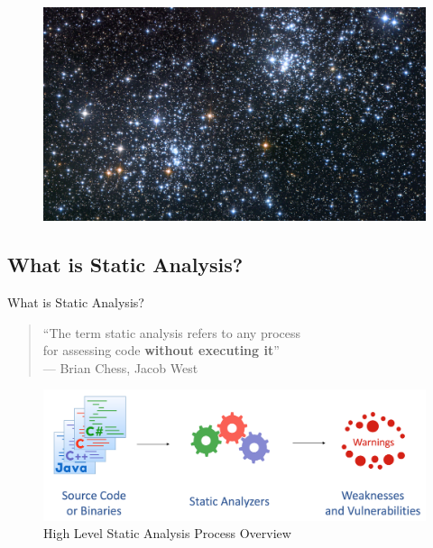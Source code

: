 \documentclass[aspectratio=169]{beamer}
\newenvironment{changemargin}[2]{%
\begin{list}{}{%
\setlength{\topsep}{0pt}%
\setlength{\leftmargin}{#1}%
\setlength{\rightmargin}{#2}%
\setlength{\listparindent}{\parindent}%
\setlength{\itemindent}{\parindent}%
\setlength{\parsep}{\parskip}%
}%
\item[]}{\end{list}}
\begin{document}
  \begin{frame}[standout]
    \begin{changemargin}{-2cm}{-2cm}
    \vspace{-0.2cm}
    \begin{figure}
      \centering
      \includegraphics[scale=0.24]{figures/universe}
    \end{figure}
    \end{changemargin}
  \end{frame}

  \subsection{What is Static Analysis?}

  \begin{frame}{What is Static Analysis?}
    \begin{quote}
      \begin{flushright}
        ``The term \alert{static analysis} refers to any process\\ for assessing code \textbf{without executing it}''\\
        --- Brian Chess, Jacob West
      \end{flushright}
    \end{quote}
    \pause
    \begin{figure}
      \centering
      \includegraphics[scale=0.35]{figures/static-analysis}
      \caption{High Level Static Analysis Process Overview}
    \end{figure}
  \end{frame}
\end{document}
